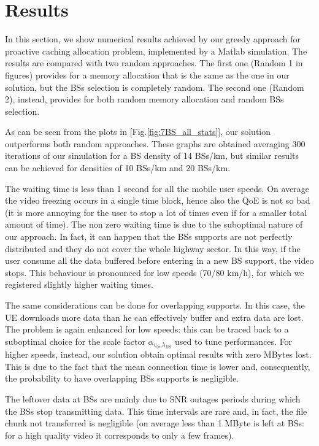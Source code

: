 \documentclass[conference,10pt]{IEEEtran}
\begin{document}
\section{Results}\label{sec:res}
In this section, we show numerical results achieved by our greedy approach for proactive caching allocation problem, implemented by a Matlab simulation. The results are compared with two random approaches. The first one (Random 1 in figures) provides for a memory allocation that is the same as the one in our solution, but the BSs selection is completely random. The second one (Random 2), instead, provides for both random memory allocation and random BSs selection.

As can be seen from the plots in [Fig.\ref{fig:7BS_all_stats}], our solution outperforms both random approaches. These graphs are obtained averaging 300 iterations of our simulation for a BS density of 14 BSs/km, but similar results can be achieved for densities of 10 BSs/km and 20 BSs/km.

The waiting time is less than 1 second for all the mobile user speeds. On average the video freezing occurs in a single time block, hence also the QoE is not so bad (it is more annoying for the user to stop a lot of times even if for a smaller total amount of time). The non zero waiting time is due to the suboptimal nature of our approach. In fact, it can happen that the BSs supports are not perfectly distributed and they do not cover the whole highway sector. In this way, if the user consume all the data buffered before entering in a new BS support, the video stops. This behaviour is pronounced for low speeds (70/80 km/h), for which we registered slightly higher waiting times.

The same considerations can be done for overlapping supports. In this case, the UE downloads more data than he can effectively buffer and extra data are lost. The problem is again enhanced for low speeds: this can be traced back to a suboptimal choice for the scale factor $\alpha_{v_0, \lambda_{B\!S}}$ used to tune performances. For higher speeds, instead, our solution obtain optimal results with zero MBytes lost. This is due to the fact that the mean connection time is lower and, consequently, the probability to have overlapping BSs supports is negligible.

The leftover data at BSs are mainly due to SNR outages periods during which the BSs stop transmitting data. This time intervals are rare and, in fact, the file chunk not transferred is negligible (on average less than 1 MByte is left at BSs: for a high quality video it corresponds to only a few frames).
\end{document}
